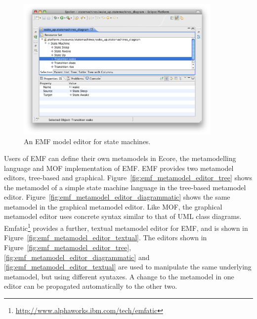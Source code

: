 \begin{figure}[htbp]
  \begin{center}
    \leavevmode
    \includegraphics[width=10cm]{2.Background/images/emf_model_editor.png}
  \end{center}
  \caption{An EMF model editor for state machines.}
  \label{fig:emf_model_editor}
\end{figure}

Users of EMF can define their own metamodels in Ecore, the metamodelling language and MOF implementation of EMF. EMF provides two metamodel editors, tree-based and graphical. Figure~\ref{fig:emf_metamodel_editor_tree} shows the metamodel of a simple state machine language in the tree-based metamodel editor. Figure~\ref{fig:emf_metamodel_editor_diagrammatic} shows the same metamodel in the graphical metamodel editor. Like MOF, the graphical metamodel editor uses concrete syntax similar to that of UML class diagrams. Emfatic\footnote{\url{http://www.alphaworks.ibm.com/tech/emfatic}} provides a further, textual metamodel editor for EMF, and is shown in Figure~\ref{fig:emf_metamodel_editor_textual}. The editors shown in Figure~\ref{fig:emf_metamodel_editor_tree}, \ref{fig:emf_metamodel_editor_diagrammatic} and \ref{fig:emf_metamodel_editor_textual} are used to manipulate the same underlying metamodel, but using different syntaxes. A change to the metamodel in one editor can be propagated automatically to the other two.

